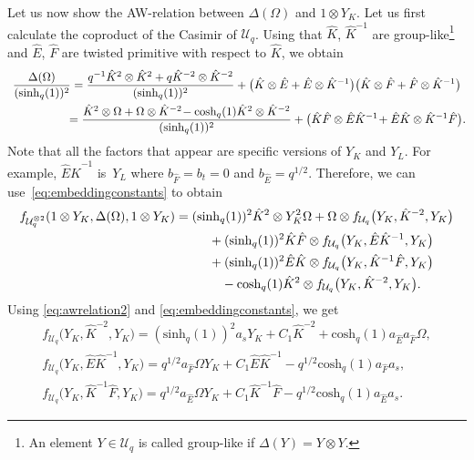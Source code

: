 \documentclass[10pt,a4paper]{amsart}
\numberwithin{equation}{section}
\newcommand{\chq}{\mathrm{cosh}_q}
\newcommand{\shq}{\mathrm{sinh}_q}
\newcommand{\Uq}{\mathcal{U}_q}
\begin{document}
Let us now show the AW-relation between $\Delta(\Omega)$ and $1\otimes Y_K$. Let us first calculate the coproduct of the Casimir of $\Uq$. Using that $\hat{K}$, $\hat{K}^{-1}$ are group-like\footnote{An element $Y\in\Uq$ is called group-like if $\Delta(Y)=Y\otimes Y$.} and ${\hat{E}}$, ${\hat{F}}$ are twisted primitive with respect to $\hat{K}$, we obtain
\begin{gather*}
\frac{\Delta(\Omega)}{(\shq(1))^2}=\frac{q^{-1} \hat{K}^2\otimes \hat{K}^2 +q \hat{K}^{-2}\otimes \hat{K}^{-2}}{(\shq(1))^2} + \big(\hat{K}\otimes {\hat{E}} + {\hat{E}}\otimes \hat{K}^{-1}\big)\big(\hat{K}\otimes {\hat{F}} + {\hat{F}}\otimes \hat{K}^{-1}\big)\nonumber\\
\hphantom{\frac{\Delta(\Omega)}{(\shq(1))^2}}{}
	=\frac{\hat{K}^2\otimes \Omega + \Omega\otimes \hat{K}^{-2}\! - \chq(1) \hat{K}^2\otimes \hat{K}^{-2}}{(\shq(1))^2} + \big(\hat{K}{\hat{F}}\otimes {\hat{E}}\hat{K}^{-1}\! + {\hat{E}}\hat{K}\otimes \hat{K}^{-1}{\hat{F}}\big).
\end{gather*}
Note that all the factors that appear are specific versions of $Y_K$ and $Y_L$. For example, ${\hat{E}}\hat{K}^{-1}$ is~$Y_L$ where $b_{\hat{F}}=b_t=0$ and $b_{\hat{E}}=q^{1/2}$. Therefore, we can use~\eqref{eq:embeddingconstants} to obtain
\begin{gather}
	f_{\Uq^{\otimes2}}(1\otimes Y_K,\Delta(\Omega),1\otimes Y_K)= (\shq(1))^2 \hat{K}^2\otimes Y_K^2\Omega + \Omega \otimes f_{\Uq}\big(Y_K,\hat{K}^{-2},Y_K\big)\nonumber \\
\hphantom{f_{\Uq^{\otimes2}}(1\otimes Y_K,\Delta(\Omega),1\otimes Y_K)=}{}
+ (\shq(1))^2\hat{K}{\hat{F}}\otimes f_{\Uq}\big(Y_K,{\hat{E}}\hat{K}^{-1},Y_K\big)\nonumber	\\
\hphantom{f_{\Uq^{\otimes2}}(1\otimes Y_K,\Delta(\Omega),1\otimes Y_K)=}{}
+(\shq(1))^2{\hat{E}}\hat{K}\otimes f_{\Uq}\big(Y_K,\hat{K}^{-1}{\hat{F}},Y_K\big)\nonumber \\
\hphantom{f_{\Uq^{\otimes2}}(1\otimes Y_K,\Delta(\Omega),1\otimes Y_K)=}{}
- \chq(1) \hat{K}^2\otimes f_{\Uq}\big(Y_K,\hat{K}^{-2},Y_K\big)\label{eq:k0coproductcasimir}.
\end{gather}
Using \eqref{eq:awrelation2} and \eqref{eq:embeddingconstants}, we get
\begin{gather*}
	f_{\Uq}\big(Y_K,\hat{K}^{-2},Y_K\big) = (\shq(1))^2 a_s Y_K + C_1\hat{K}^{-2} + \chq(1)a_{\hat{E}}a_{\hat{F}}\Omega,\\
	f_{\Uq}\big(Y_K,{\hat{E}}\hat{K}^{-1},Y_K\big) = q^{1/2}a_{\hat{F}}\Omega Y_K + C_1 {\hat{E}}\hat{K}^{-1} - q^{1/2}\chq(1)a_{\hat{F}}a_s,\\
	f_{\Uq}\big(Y_K,\hat{K}^{-1}{\hat{F}},Y_K\big) = q^{1/2}a_{\hat{E}}\Omega Y_K + C_1 \hat{K}^{-1}{\hat{F}} - q^{1/2}\chq(1)a_{\hat{E}}a_s.
\end{gather*}
\end{document}
